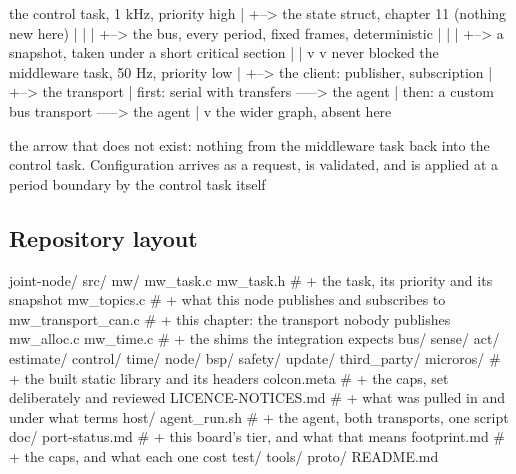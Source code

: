 \begin{asciiart}
  the control task, 1 kHz, priority high
        |
        +--> the state struct, chapter 11                 (nothing new here)
        |          |
        |          +--> the bus, every period, fixed frames, deterministic
        |          |
        |          +--> a snapshot, taken under a short critical section
        |                     |
        v                     v
  never blocked        the middleware task, 50 Hz, priority low
                              |
                              +--> the client: publisher, subscription
                                        |
                                        +--> the transport
                                                 |
                              first: serial with transfers -----> the agent
                                                 |
                              then: a custom bus transport -----> the agent
                                                 |
                                                 v
                                        the wider graph, absent here

  the arrow that does not exist: nothing from the middleware task back into
  the control task. Configuration arrives as a request, is validated, and is
  applied at a period boundary by the control task itself
\end{asciiart}

\subsection*{Repository layout}

\begin{plaincode}
joint-node/
  src/
    mw/
      mw_task.c mw_task.h        # + the task, its priority and its snapshot
      mw_topics.c                # + what this node publishes and subscribes to
      mw_transport_can.c         # + this chapter: the transport nobody publishes
      mw_alloc.c mw_time.c       # + the shims the integration expects
    bus/ sense/ act/ estimate/ control/ time/ node/ bsp/
    safety/  update/
  third_party/
    microros/                    # + the built static library and its headers
      colcon.meta                # + the caps, set deliberately and reviewed
      LICENCE-NOTICES.md         # + what was pulled in and under what terms
  host/
    agent_run.sh                 # + the agent, both transports, one script
  doc/
    port-status.md               # + this board's tier, and what that means
    footprint.md                 # + the caps, and what each one cost
  test/  tools/  proto/  README.md
\end{plaincode}


